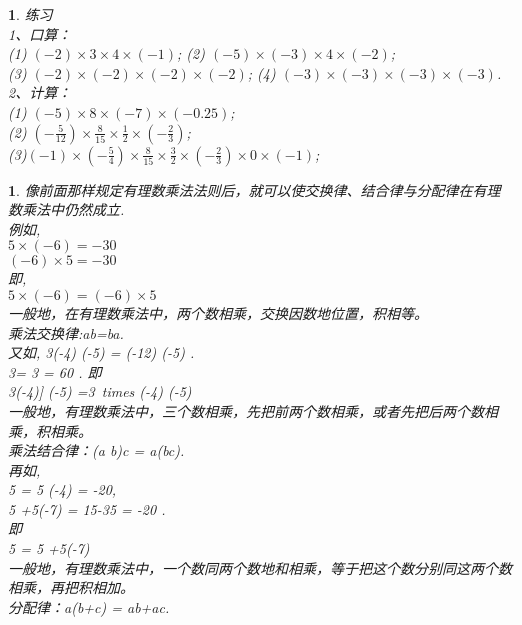 \documentclass[11pt]{article}
\newtheorem{exercise}{ }
\newtheorem{nature}{ }
\begin{document}
\begin{exercise}
练习\\
1、口算：\\
(1) $(-2) \times 3 \times 4 \times (-1)$;  (2) $(-5) \times (-3) \times 4 \times (-2)$;\\
(3) $(-2) \times (-2) \times (-2) \times (-2)$;  (4) $(-3) \times (-3) \times (-3) \times (-3)$.\\

2、计算：\\
(1) $(-5) \times 8 \times (-7) \times (-0.25)$;\\
(2) $ (-\frac{5}{12}) \times \frac{8}{15} \times \frac{1}{2} \times (-\frac{2}{3}) $;\\
(3)$ (-1) \times (-\frac{5}{4}) \times \frac{8}{15} \times \frac{3}{2} \times (-\frac{2}{3}) \times 0 \times (-1) $;\\
\end{exercise}
\begin{nature}
    像前面那样规定有理数乘法法则后，就可以使交换律、结合律与分配律在有理数乘法中仍然成立.\\
    例如,\\
        $ 5\times(-6)=-30 $\\
        $ (-6)\times 5 = -30 $\\
    即,\\
        $ 5\times (-6) = (-6) \times 5 $\\
    一般地，在有理数乘法中，两个数相乘，交换因数地位置，积相等。\\
        乘法交换律:ab=ba.\\
        又如,     3\times (-4) \times (-5) = (-12) \times (-5) .\\
         3\times [(-4) \times (-5)] = 3  = 60 .
        即\\
        3\times (-4)] \times (-5) =3\ times (-4) \times (-5)\\
        一般地，有理数乘法中，三个数相乘，先把前两个数相乘，或者先把后两个数相乘，积相乘。\\
            乘法结合律：(a b)c = a(bc).\\
        再如,\\
            5 \times [3+(-7)] = 5 \times (-4) = -20, \\
            5 +5\times(-7) = 15-35 = -20 .\\
        即\\
             5 \times [3+(-7)] = 5 +5\times(-7)\\
        一般地，有理数乘法中，一个数同两个数地和相乘，等于把这个数分别同这两个数相乘，再把积相加。\\
            分配律：a(b+c) = ab+ac.\\
\end{nature}
\end{document}
